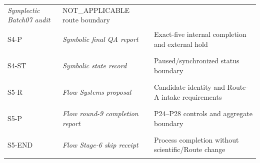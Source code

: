 \begin{longtable}[]{@{}lll@{}}
\begin{minipage}[t]{0.30\columnwidth}
\textit{Symplectic Batch07 audit}\strut
\end{minipage} & \begin{minipage}[t]{0.30\columnwidth}\raggedright
NOT\_APPLICABLE route boundary\strut
\end{minipage}\tabularnewline
\begin{minipage}[t]{0.30\columnwidth}\raggedright
\hypertarget{record:S4-P}{S4-P}\strut
\end{minipage} & \begin{minipage}[t]{0.30\columnwidth}\raggedright
\textit{Symbolic final QA report}\strut
\end{minipage} & \begin{minipage}[t]{0.30\columnwidth}\raggedright
Exact-five internal completion and external hold\strut
\end{minipage}\tabularnewline
\begin{minipage}[t]{0.30\columnwidth}\raggedright
\hypertarget{record:S4-ST}{S4-ST}\strut
\end{minipage} & \begin{minipage}[t]{0.30\columnwidth}\raggedright
\textit{Symbolic state record}\strut
\end{minipage} & \begin{minipage}[t]{0.30\columnwidth}\raggedright
Paused/synchronized status boundary\strut
\end{minipage}\tabularnewline
\begin{minipage}[t]{0.30\columnwidth}\raggedright
\hypertarget{record:S5-R}{S5-R}\strut
\end{minipage} & \begin{minipage}[t]{0.30\columnwidth}\raggedright
\textit{Flow Systems proposal}\strut
\end{minipage} & \begin{minipage}[t]{0.30\columnwidth}\raggedright
Candidate identity and Route-A intake requirements\strut
\end{minipage}\tabularnewline
\begin{minipage}[t]{0.30\columnwidth}\raggedright
\hypertarget{record:S5-P}{S5-P}\strut
\end{minipage} & \begin{minipage}[t]{0.30\columnwidth}\raggedright
\textit{Flow round-9 completion report}\strut
\end{minipage} & \begin{minipage}[t]{0.30\columnwidth}\raggedright
P24--P28 controls and aggregate boundary\strut
\end{minipage}\tabularnewline
\begin{minipage}[t]{0.30\columnwidth}\raggedright
\hypertarget{record:S5-END}{S5-END}\strut
\end{minipage} & \begin{minipage}[t]{0.30\columnwidth}\raggedright
\textit{Flow Stage-6 skip receipt}\strut
\end{minipage} & \begin{minipage}[t]{0.30\columnwidth}\raggedright
Process completion without scientific/Route change\strut
\end{minipage}\tabularnewline
\bottomrule
\end{longtable}
\endgroup
